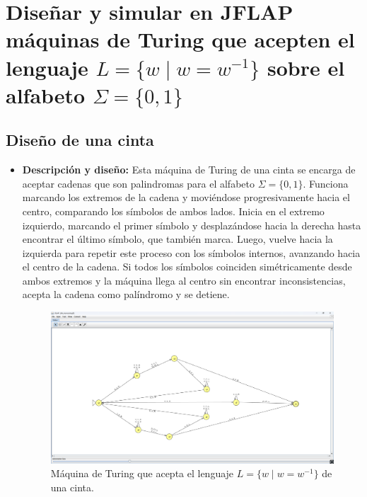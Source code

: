 \documentclass[11pt]{report}
\begin{document}
\newpage

\section{Diseñar y simular en JFLAP máquinas de Turing que acepten el lenguaje \(L = \{w \mid w = w^{-1}\}\) sobre el alfabeto \(\Sigma = \{0, 1\}\)}
\subsection{Diseño de una cinta}
\begin{itemize}
  \item \textbf{Descripción y diseño:} Esta máquina de Turing de una cinta se encarga de aceptar cadenas que son palindromas para el alfabeto \(\Sigma = \{0, 1\}\). Funciona marcando los extremos de la cadena y moviéndose progresivamente hacia el centro, comparando los símbolos de ambos lados. Inicia en el extremo izquierdo, marcando el primer símbolo y desplazándose hacia la derecha hasta encontrar el último símbolo, que también marca. Luego, vuelve hacia la izquierda para repetir este proceso con los símbolos internos, avanzando hacia el centro de la cadena. Si todos los símbolos coinciden simétricamente desde ambos extremos y la máquina llega al centro sin encontrar inconsistencias, acepta la cadena como palíndromo y se detiene.

        \begin{figure}[H]
          \centering
          \includegraphics[scale=0.33]{img/MT_04_one_ribbon.png}
          \caption{Máquina de Turing que acepta el lenguaje \(L = \{w \mid w = w^{-1}\}\) de una cinta.}
          \label{fig:maquina de turing que acepta el lenguaje L = {w | w = w^{-1}} de una cinta}
        \end{figure}

        \newpage


\end{itemize}
\end{document}
